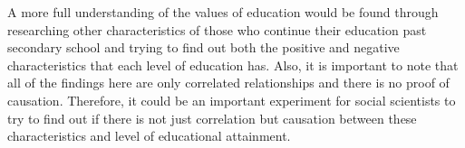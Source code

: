 \documentclass{article}
\begin{document}
A more full understanding of the values of education would be found through researching other characteristics of those
who continue their education past secondary school and trying to find out both the positive and negative characteristics
that each level of education has. Also, it is important to note that all of the findings here are only correlated relationships and 
there is no proof of causation. Therefore, it could be an important experiment for social scientists to try to find out if there
is not just correlation but causation between these characteristics and level of educational attainment. 
\end{document}
